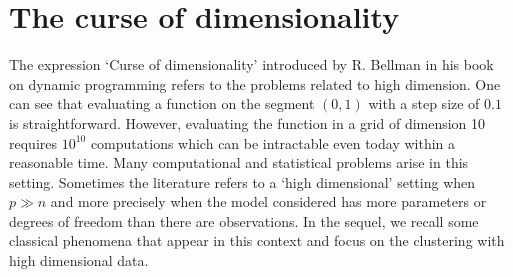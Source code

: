 \section{The curse of dimensionality}\label{sec:hd_curse}
\label{curse_dim_section}
The expression `Curse of dimensionality' introduced by R. Bellman in his book on dynamic programming \citep{Bellman:1957} refers to the problems related to high dimension. One can see that evaluating a function on the segment $(0,1)$ with a step size of $0.1$ is straightforward. However, evaluating the function in a grid of dimension 10 requires $10^{10}$ computations which can be intractable even today within a reasonable time. Many computational and statistical problems arise in this setting. Sometimes the literature refers to a `high dimensional' setting when $p \gg n$ and more precisely when the model considered has more parameters or degrees of freedom than there are observations. In the sequel, we recall some classical phenomena that appear in this context and focus on the clustering with high dimensional data. 

